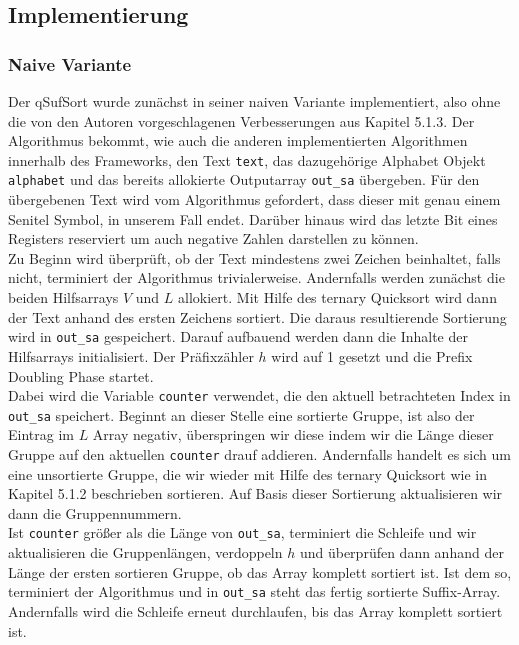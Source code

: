 \subsection{Implementierung}
\subsubsection{Naive Variante}
Der qSufSort wurde zunächst in seiner naiven Variante implementiert, also ohne die von den Autoren vorgeschlagenen Verbesserungen aus Kapitel 5.1.3. Der Algorithmus bekommt, wie auch die anderen implementierten Algorithmen innerhalb des Frameworks, den Text \texttt{text}, das dazugehörige Alphabet Objekt \texttt{alphabet} und das bereits allokierte Outputarray \texttt{out_sa} übergeben. Für den übergebenen Text wird vom Algorithmus gefordert, dass dieser mit genau einem Senitel Symbol, in unserem Fall endet. Darüber hinaus wird das letzte Bit eines Registers reserviert um auch negative Zahlen darstellen zu können.\\
Zu Beginn wird überprüft, ob der Text mindestens zwei Zeichen beinhaltet, falls nicht, terminiert der Algorithmus trivialerweise. Andernfalls werden zunächst die beiden Hilfsarrays $V$ und $L$ allokiert. Mit Hilfe des ternary Quicksort wird dann der Text anhand des ersten Zeichens sortiert. Die daraus resultierende Sortierung wird in \texttt{out_sa} gespeichert. Darauf aufbauend werden dann die Inhalte der Hilfsarrays initialisiert. Der Präfixzähler $h$ wird auf 1 gesetzt und die Prefix Doubling Phase startet. \\
Dabei wird die Variable \texttt{counter} verwendet, die den aktuell betrachteten Index in \texttt{out_sa} speichert. Beginnt an dieser Stelle eine sortierte Gruppe, ist also der Eintrag im $L$ Array negativ, überspringen wir diese indem wir die Länge dieser Gruppe auf den aktuellen \texttt{counter} drauf addieren. Andernfalls handelt es sich um eine unsortierte Gruppe, die wir wieder mit Hilfe des ternary Quicksort wie in Kapitel 5.1.2 beschrieben sortieren. Auf Basis dieser Sortierung aktualisieren wir dann die Gruppennummern.\\ 
Ist \texttt{counter} größer als die Länge von \texttt{out_sa}, terminiert die Schleife und wir aktualisieren die Gruppenlängen, verdoppeln $h$ und überprüfen dann anhand der Länge der ersten sortieren Gruppe, ob das Array komplett sortiert ist. Ist dem so, terminiert der Algorithmus und in \texttt{out_sa} steht das fertig sortierte Suffix-Array. Andernfalls wird die Schleife erneut durchlaufen, bis das Array komplett sortiert ist.\\
